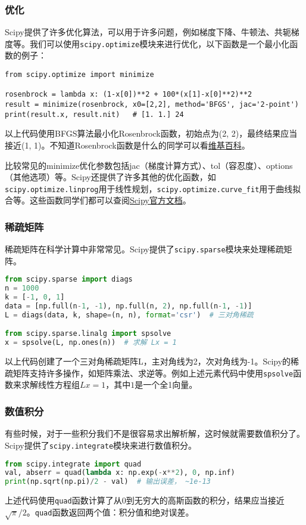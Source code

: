 \documentclass[../main.tex]{subfiles}
\begin{document}
\subsubsection{优化}
Scipy提供了许多优化算法，可以用于许多问题，例如梯度下降、牛顿法、共轭梯度等。我们可以使用\texttt{scipy.optimize}模块来进行优化，以下函数是一个最小化函数的例子：
\begin{lstlisting}
from scipy.optimize import minimize

rosenbrock = lambda x: (1-x[0])**2 + 100*(x[1]-x[0]**2)**2
result = minimize(rosenbrock, x0=[2,2], method='BFGS', jac='2-point')
print(result.x, result.nit)   # [1. 1.] 24
\end{lstlisting}
以上代码使用BFGS算法最小化Rosenbrock函数，初始点为(2, 2)，最终结果应当接近(1, 1)。不知道Rosenbrock函数是什么的同学可以看\href{https://en.wikipedia.org/wiki/Rosenbrock_function}{维基百科}。

比较常见的minimize优化参数包括jac（梯度计算方式）、tol（容忍度）、options（其他选项）等。Scipy还提供了许多其他的优化函数，如\texttt{scipy.optimize.linprog}用于线性规划，\texttt{scipy.optimize.curve\_fit}用于曲线拟合等。这些函数同学们都可以查阅\href{https://docs.scipy.org/doc/scipy/reference/optimize.html}{Scipy官方文档}。

\subsubsection{稀疏矩阵}

稀疏矩阵在科学计算中非常常见。Scipy提供了\texttt{scipy.sparse}模块来处理稀疏矩阵。

\begin{lstlisting}[language=python]
from scipy.sparse import diags
n = 1000
k = [-1, 0, 1]
data = [np.full(n-1, -1), np.full(n, 2), np.full(n-1, -1)]
L = diags(data, k, shape=(n, n), format='csr')  # 三对角稀疏

from scipy.sparse.linalg import spsolve
x = spsolve(L, np.ones(n))  # 求解 Lx = 1
\end{lstlisting}
以上代码创建了一个三对角稀疏矩阵L，主对角线为2，次对角线为-1。Scipy的稀疏矩阵支持许多操作，如矩阵乘法、求逆等。例如上述元素代码中使用\texttt{spsolve}函数来求解线性方程组$Lx = 1$，其中$1$是一个全1向量。

\subsubsection{数值积分}

有些时候，对于一些积分我们不是很容易求出解析解，这时候就需要数值积分了。Scipy提供了\texttt{scipy.integrate}模块来进行数值积分。
\begin{lstlisting}[language=python]
from scipy.integrate import quad
val, abserr = quad(lambda x: np.exp(-x**2), 0, np.inf)
print(np.sqrt(np.pi)/2 - val)  # 输出误差， ~1e-13
\end{lstlisting}
上述代码使用\texttt{quad}函数计算了从0到无穷大的高斯函数的积分，结果应当接近$\sqrt{\pi}/2$。\texttt{quad}函数返回两个值：积分值和绝对误差。
\end{document}
